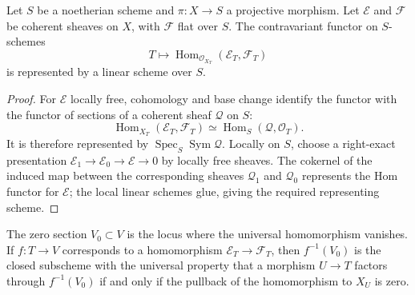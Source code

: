 \begin{theorem}\label{fga-the-5-8}
Let $S$ be a noetherian scheme and $\pi:X\to S$ a projective morphism.  Let
$\mathcal E$ and $\mathcal F$ be coherent sheaves on $X$, with $\mathcal F$
flat over $S$.  The contravariant functor on $S$-schemes
\[
T\longmapsto
\operatorname{Hom}_{\mathcal O_{X_T}}(\mathcal E_T,\mathcal F_T)
\]
is represented by a linear scheme over $S$.
\end{theorem}
\begin{proof}
For $\mathcal E$ locally free, cohomology and base change identify the functor
with the functor of sections of a coherent sheaf $\mathcal Q$ on $S$:
\[
\operatorname{Hom}_{X_T}(\mathcal E_T,\mathcal F_T)
\simeq\operatorname{Hom}_{S}(\mathcal Q,\mathcal O_T).
\]
It is therefore represented by $\operatorname{Spec}_S\operatorname{Sym}\mathcal Q$.
Locally on $S$, choose a right-exact presentation
$\mathcal E_1\to\mathcal E_0\to\mathcal E\to0$ by locally free sheaves.
The cokernel of the induced map between the corresponding sheaves $\mathcal Q_1$
and $\mathcal Q_0$ represents the Hom functor for $\mathcal E$; the local
linear schemes glue, giving the required representing scheme.
\end{proof}

\begin{remark}\label{fga-rem-5-9}
The zero section $V_0\subset V$ is the locus where the universal homomorphism
vanishes.  If $f:T\to V$ corresponds to a homomorphism
$\mathcal E_T\to\mathcal F_T$, then $f^{-1}(V_0)$ is the closed subscheme with
the universal property that a morphism $U\to T$ factors through $f^{-1}(V_0)$
if and only if the pullback of the homomorphism to $X_U$ is zero.
\end{remark}
